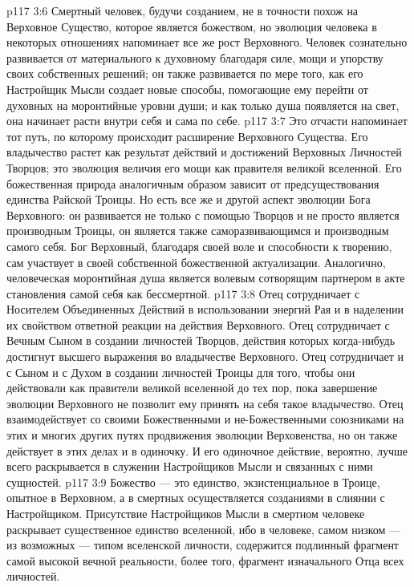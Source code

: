 \vs p117 3:6 Смертный человек, будучи созданием, не в точности похож на Верховное Существо, которое является божеством, но эволюция человека в некоторых отношениях напоминает все же рост Верховного. Человек сознательно развивается от материального к духовному благодаря силе, мощи и упорству своих собственных решений; он также развивается по мере того, как его Настройщик Мысли создает новые способы, помогающие ему перейти от духовных на моронтийные уровни души; и как только душа появляется на свет, она начинает расти внутри себя и сама по себе.
\vs p117 3:7 Это отчасти напоминает тот путь, по которому происходит расширение Верховного Существа. Его владычество растет как результат действий и достижений Верховных Личностей Творцов; это эволюция величия его мощи как правителя великой вселенной. Его божественная природа аналогичным образом зависит от предсуществования единства Райской Троицы. Но есть все же и другой аспект эволюции Бога Верховного: он развивается не только с помощью Творцов и не просто является производным Троицы, он является также саморазвивающимся и производным самого себя. Бог Верховный, благодаря своей воле и способности к творению, сам участвует в своей собственной божественной актуализации. Аналогично, человеческая моронтийная душа является волевым сотворящим партнером в акте становления самой себя как бессмертной.
\vs p117 3:8 \pc Отец сотрудничает с Носителем Объединенных Действий в использовании энергий Рая и в наделении их свойством ответной реакции на действия Верховного. Отец сотрудничает с Вечным Сыном в создании личностей Творцов, действия которых когда\hyp{}нибудь достигнут высшего выражения во владычестве Верховного. Отец сотрудничает и с Сыном и с Духом в создании личностей Троицы для того, чтобы они действовали как правители великой вселенной до тех пор, пока завершение эволюции Верховного не позволит ему принять на себя такое владычество. Отец взаимодействует со своими Божественными и не\hyp{}Божественными союзниками на этих и многих других путях продвижения эволюции Верховенства, но он также действует в этих делах и в одиночку. И его одиночное действие, вероятно, лучше всего раскрывается в служении Настройщиков Мысли и связанных с ними сущностей.
\vs p117 3:9 Божество --- это единство, экзистенциальное в Троице, опытное в Верховном, а в смертных осуществляется созданиями в слиянии с Настройщиком. Присутствие Настройщиков Мысли в смертном человеке раскрывает существенное единство вселенной, ибо в человеке, самом низком --- из возможных --- типом вселенской личности, содержится подлинный фрагмент самой высокой вечной реальности, более того, фрагмент изначального Отца всех личностей.
